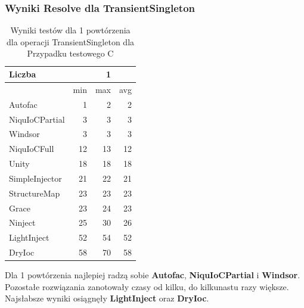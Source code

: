 \documentclass[12pt]{article}
\begin{document}
\subsubsection{Wyniki Resolve dla TransientSingleton}
\begin{table}[H]
\captionsetup{belowskip=0pt,aboveskip=0pt}
\begin{center}
\begin{small}
	\begin{tabular}{ | l | r r r | }
    		\hline
Liczba & & 1 & \\ \hline
 & min & max & avg \\ \hline
Autofac & 1 & 2 & 2 \\ \hline
NiquIoCPartial & 3 & 3 & 3 \\ \hline
Windsor & 3 & 3 & 3 \\ \hline
NiquIoCFull & 12 & 13 & 12 \\ \hline
Unity & 18 & 18 & 18 \\ \hline
SimpleInjector & 21 & 22 & 21 \\ \hline
StructureMap & 23 & 23 & 23 \\ \hline
Grace & 23 & 24 & 23 \\ \hline
Ninject & 25 & 30 & 26 \\ \hline
LightInject & 52 & 54 & 52 \\ \hline
DryIoc & 58 & 70 & 58 \\ \hline
  	\end{tabular}
\end{small}
\end{center}
\caption{Wyniki testów dla 1 powtórzenia dla operacji TransientSingleton dla Przypadku testowego C}
\label{TestCaseC_TransientSingleton1}
\end{table}
Dla 1 powtórzenia najlepiej radzą sobie \textbf{Autofac}, \textbf{NiquIoCPartial} i \textbf{Windsor}. Pozostałe rozwiązania zanotowały czasy od kilku, do kilkunastu razy większe. Najsłabsze wyniki osiągnęły \textbf{LightInject} oraz \textbf{DryIoc}.
\\ \\
\end{document}
